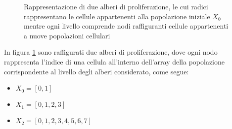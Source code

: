 \begin{figure}[t]
    \begin{minipage}[b]{.5\linewidth}
    \centering
    \end{minipage}
    \begin{minipage}[b]{.5\linewidth}
    \centering
    \end{minipage}
    \caption{Rappresentazione di due alberi di proliferazione, le cui radici
        rappresentano le cellule appartenenti alla popolazione iniziale $X_{0}$
        mentre ogni livello comprende nodi raffiguranti cellule appartenenti
        a nuove popolazioni cellulari}
    \label{fig:prolif-tree}
\end{figure}
In figura \ref{fig:prolif-tree} sono raffigurati due alberi di proliferazione,
dove ogni nodo
rappresenta l'indice di una cellula all'interno dell'array della popolazione
corrispondente al livello degli alberi considerato, come segue:

\begin{itemize}
    \item $X_{0} = [0, 1]$
    \item $X_{1} = [0, 1, 2, 3]$
    \item $X_{2} = [0, 1, 2, 3, 4, 5, 6, 7]$    
\end{itemize}

